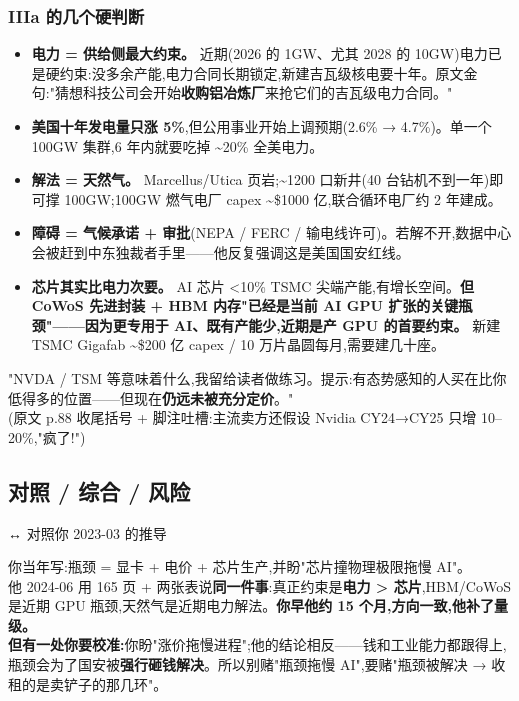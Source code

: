 \subsubsection{IIIa 的几个硬判断}\label{iiia-ux7684ux51e0ux4e2aux786cux5224ux65ad}

\begin{itemize}
\tightlist
\item
  \textbf{电力 = 供给侧最大约束。} 近期(2026 的 1GW、尤其 2028 的 10GW)电力已是硬约束:没多余产能,电力合同长期锁定,新建吉瓦级核电要十年。原文金句:"猜想科技公司会开始\textbf{收购铝冶炼厂}来抢它们的吉瓦级电力合同。"
\item
  \textbf{美国十年发电量只涨 5\%},但公用事业开始上调预期(2.6\% → 4.7\%)。单一个 100GW 集群,6 年内就要吃掉 \textasciitilde20\% 全美电力。
\item
  \textbf{解法 = 天然气。} Marcellus/Utica 页岩;\textasciitilde1200 口新井(40 台钻机不到一年)即可撑 100GW;100GW 燃气电厂 capex \textasciitilde\$1000 亿,联合循环电厂约 2 年建成。
\item
  \textbf{障碍 = 气候承诺 + 审批}(NEPA / FERC / 输电线许可)。若解不开,数据中心会被赶到中东独裁者手里------他反复强调这是美国国安红线。
\item
  \textbf{芯片其实比电力次要。} AI 芯片 \textless10\% TSMC 尖端产能,有增长空间。\textbf{但 CoWoS 先进封装 + HBM 内存"已经是当前 AI GPU 扩张的关键瓶颈"------因为更专用于 AI、既有产能少,近期是产 GPU 的首要约束。} 新建 TSMC Gigafab \textasciitilde\$200 亿 capex / 10 万片晶圆每月,需要建几十座。
\end{itemize}

"NVDA / TSM 等意味着什么,我留给读者做练习。提示:有态势感知的人买在比你低得多的位置------但现在\textbf{仍远未被充分定价}。"\\
(原文 p.88 收尾括号 + 脚注吐槽:主流卖方还假设 Nvidia CY24→CY25 只增 10--20\%,"疯了!")

\subsection{对照 / 综合 / 风险}\label{ux5bf9ux7167-ux7efcux5408-ux98ceux9669}

↔ 对照你 2023-03 的推导

你当年写:瓶颈 = 显卡 + 电价 + 芯片生产,并盼"芯片撞物理极限拖慢 AI"。\\
他 2024-06 用 165 页 + 两张表说\textbf{同一件事}:真正约束是\textbf{电力 \textgreater{} 芯片},HBM/CoWoS 是近期 GPU 瓶颈,天然气是近期电力解法。\textbf{你早他约 15 个月,方向一致,他补了量级。}\\
\textbf{但有一处你要校准:}你盼"涨价拖慢进程";他的结论相反------钱和工业能力都跟得上,瓶颈会为了国安被\textbf{强行砸钱解决}。所以别赌"瓶颈拖慢 AI",要赌"瓶颈被解决 → 收租的是卖铲子的那几环"。

